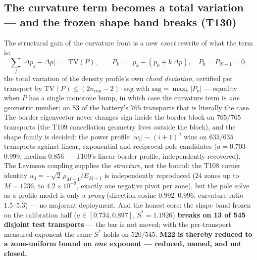 \documentclass[11pt,a4paper]{article}
\begin{document}
\subsection{The curvature term becomes a total variation --- and the frozen shape band breaks (T130)}
The structural gain of the curvature front is a new \emph{exact} rewrite of what the term is:
\[
\sum_j\bigl|\Delta p_j-\overline{\Delta p}\bigr| \;=\; \mathrm{TV}(P),\qquad
P_k \;=\; p_k-(p_0+k\,\overline{\Delta p}),\quad P_0=P_{N-1}=0 ,
\]
the total variation of the density profile's own \emph{chord deviation}, certified per
transport by $\mathrm{TV}(P)\le(2n_{\mathrm{run}}-2)\cdot\mathrm{sag}$ with
$\mathrm{sag}=\max_k|P_k|$ --- equality when $P$ has a single monotone hump, in which case the
curvature term is \emph{one} geometric number; on $83$ of the battery's $765$ transports that
is literally the case. The border eigenvector never changes sign inside the border block on
$765/765$ transports (the T109 cancellation geometry lives outside the block), and the shape
family is decided: the power profile $|w_i|\sim(i+1)^a$ wins on $635/635$ transports against
linear, exponential and reciprocal-pole candidates ($a=0.703$--$0.999$, median $0.856$ ---
T109's linear border profile, independently recovered). The Levinson coupling supplies the
\emph{structure}, not the bound: the T108 corner identity
$u_0=-\sqrt2\,\rho_{M-1}/E_{M-1}$ is independently reproduced ($24$ zones up to $M=1236$, to
$4.2\times10^{-9}$, exactly one negative pivot per zone), but the pole solve as a profile
model is only a \emph{proxy} (direction cosine $0.992$--$0.996$, curvature ratio
$1.5$--$5.3$) --- no majorant deployment. And the honest core: the shape band frozen on the
calibration half ($a\in[0.734,0.897]$, $S^*=1.1926$) \textbf{breaks on 13 of 545 disjoint
test transports} --- the bar is not moved; with the per-transport measured exponent the same
$S^*$ holds on $520/545$. \textbf{M22 is thereby reduced to a zone-uniform bound on
\emph{one} exponent --- reduced, named, and not closed.}
\end{document}
